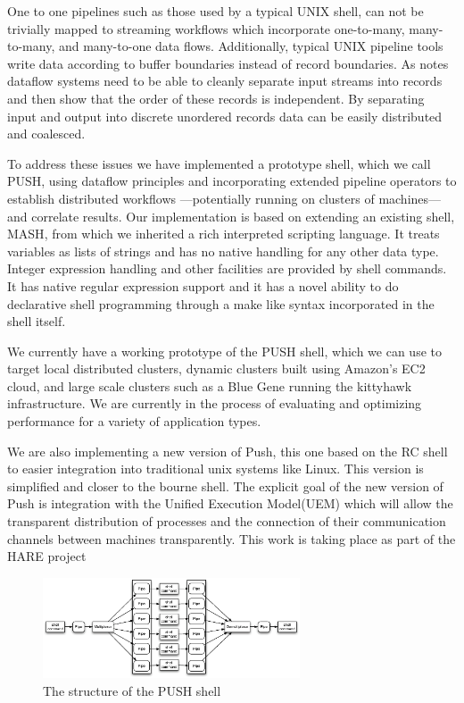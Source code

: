 \documentclass{sig-alt-release2}
\begin{document}
One to one pipelines such as those used by a typical UNIX shell,
can not be trivially mapped to streaming workflows which incorporate
one-to-many, many-to-many, and many-to-one data flows.  Additionally,
typical UNIX pipeline tools write data according to buffer boundaries
instead of record boundaries.  As \cite{pike2005idp} notes dataflow
systems need to be able to cleanly separate input streams into
records and then show that the order of these records is independent.
By separating input and output into discrete unordered records data
can be easily distributed and coalesced.

To address these issues we have implemented a prototype shell, which
we call PUSH, using dataflow principles and incorporating extended
pipeline operators to establish distributed workflows ---potentially
running on clusters of machines--- and correlate results.  Our
implementation is based on extending an existing shell, MASH\cite{mashman},
from which we inherited a rich interpreted scripting language.  It
treats variables as lists of strings and has no native handling for
any other data type.  Integer expression handling and other facilities
are provided by shell commands.  It has native regular expression
support and it has a novel ability to do declarative shell programming
through a make like syntax incorporated in the shell itself.

We currently have a working prototype of the PUSH shell, which we
can use to target local distributed clusters, dynamic clusters built
using Amazon's EC2 cloud, and large scale clusters such as a Blue
Gene running the kittyhawk infrastructure.  We are currently in the
process of evaluating and optimizing performance for a variety of
application types.


We are also implementing a new version of Push, this one based on
the RC shell\cite{} to easier integration into traditional unix
systems like Linux. This version is simplified and closer to the
bourne shell. The explicit goal of the new version of Push is
integration with the Unified Execution Model(UEM)\cite{} which will
allow the transparent distribution of processes and the connection
of their communication channels between machines transparently.
This work is taking place as part of the HARE project\cite{} 


\begin{figure}[htp]
\centering
\includegraphics[width=3in]{pipestruct.eps}
\caption{The structure of the PUSH shell}
\label{fig:pipestruct} 
\end{figure}
\end{document}
